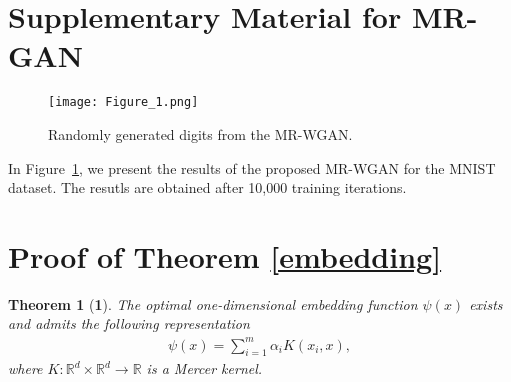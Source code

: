 \documentclass[10pt,twocolumn,letterpaper]{article}
\newtheorem*{thm*}{Theorem}
\begin{document}
{\small
	
	
}

\appendix
\onecolumn
\section*{Supplementary Material for MR-GAN }
\begin{figure}[h]
    \centering
    \texttt{[image: Figure\_1.png]}
    \caption{\small{Randomly generated digits from the MR-WGAN.}}
    \label{fig:mnist_sm}
\end{figure}
In Figure~\ref{fig:mnist_sm}, we present the results of the proposed MR-WGAN for the MNIST dataset. The resutls are obtained after 10,000 training iterations.
\section{Proof of Theorem \ref{embedding}}
\begin{thm*}[\bf 1]
	The optimal one-dimensional embedding function $\psi(x)$ exists and admits the following representation
	\begin{align}
	\psi(x)=\sum_{i=1}^{m}\alpha_i K(x_i,x),
	\end{align}
	where $K: \mathbb{R}^d \times \mathbb{R}^d \rightarrow \mathbb{R}$ is a Mercer kernel.
\end{thm*}
\end{document}
